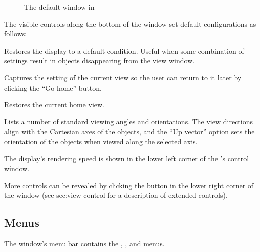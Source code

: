 \begin{figure}[htb]
  \begin{makeimage}
  \end{makeimage}
  \viewerwindow
  \caption{\label{fig:viewwindow} The default \viewer{} window in \SR{}}
\end{figure}


The visible controls along the bottom of the \viewer{} window set default
configurations as follows:
%
\begin{description}
   Restores the display to a default
  condition.  Useful when some combination of settings result in
  objects disappearing from the view window.
  
   Captures the setting of the current view
  so the user can return to it later by clicking the ``Go home''
  button.

   Restores the current home view.
  
   Lists a number of standard viewing angles
  and orientations.  The view directions align with the Cartesian axes
  of the objects, and the ``Up vector'' option sets the orientation of
  the objects when viewed along the selected axis.
\end{description}

The display's rendering speed is shown in the lower left corner of the
\viewer{}'s control window.  

More controls can be revealed by clicking the
\latexhtml{\fbox{+}}{\button{[+]}} button in the lower right corner of
the \viewer{} window (see 
{sec:view-control} for a description of extended controls).


\subsection{Menus}

The \viewer{} window's menu bar contains the , ,
and  menus.

